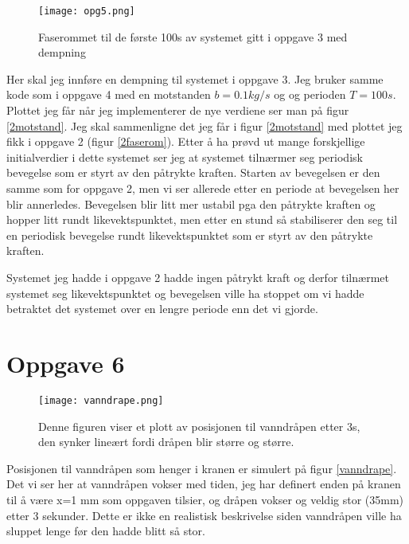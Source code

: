 \documentclass[norsk,a4paper,12pt]{article}
\begin{document}
\begin{figure}
	\begin{center}
	\texttt{[image: opg5.png]}
	\caption[Faserommet for de første 100s]{Faserommet til de første 100s av systemet gitt i oppgave 3 med dempning}
	\label{2motstand}
	\end{center}
\end{figure}
Her skal jeg innføre en dempning til systemet i oppgave 3. Jeg bruker samme kode som i oppgave 4 med en motstanden $b=0.1kg/s$ og og perioden $T=100s$. 
Plottet jeg får når jeg implementerer de nye verdiene ser man på figur \vref{2motstand}. Jeg skal sammenligne det jeg får i figur \vref{2motstand} 
med plottet jeg fikk i oppgave 2 (figur \vref{2faserom}). Etter å ha prøvd ut mange forskjellige initialverdier i dette systemet ser jeg at systemet tilnærmer seg periodisk bevegelse som er styrt av den påtrykte kraften. Starten av bevegelsen er den samme som for oppgave 2, men vi ser allerede etter en periode at bevegelsen her blir annerledes. Bevegelsen blir litt mer ustabil pga den påtrykte kraften og hopper litt rundt likevektspunktet, men etter en stund så stabiliserer den seg til en periodisk bevegelse rundt likevektspunktet som er styrt av den påtrykte kraften.

Systemet jeg hadde i oppgave 2 hadde ingen påtrykt kraft og derfor tilnærmet systemet seg likevektspunktet og bevegelsen ville ha stoppet om vi hadde betraktet det systemet over en lengre periode enn det vi gjorde. 

\section{Oppgave 6}
\begin{figure}
	\begin{center}
	\texttt{[image: vanndrape.png]}
	\caption[Plott av vanndråpen etter 3s]{Denne figuren viser et plott av posisjonen til vanndråpen etter 3s, den synker lineært fordi dråpen blir større og større.}
	\label{vanndrape}
	\end{center}
\end{figure}
Posisjonen til vanndråpen som henger i kranen er simulert på figur \vref{vanndrape}. Det vi ser her at vanndråpen vokser med tiden, jeg har definert enden på kranen til å være x=1 mm som oppgaven tilsier, og dråpen vokser og veldig stor (35mm) etter 3 sekunder. Dette er ikke en realistisk beskrivelse siden vanndråpen ville ha sluppet lenge før den hadde blitt så stor.
\end{document}
